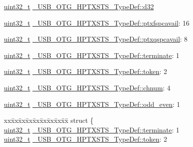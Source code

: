 \begin{DoxyCompactItemize}
\begin{tabbing}
\end{tabbing}\item 
\hyperlink{stdint_8h_a435d1572bf3f880d55459d9805097f62}{uint32\-\_\-t} \hyperlink{group___u_s_b___o_t_g___d_r_i_v_e_r_ga37309ecbbd147a4d89043f7e73582dc4}{\-\_\-\-U\-S\-B\-\_\-\-O\-T\-G\-\_\-\-H\-P\-T\-X\-S\-T\-S\-\_\-\-Type\-Def\-::d32}
\item 
\hyperlink{stdint_8h_a435d1572bf3f880d55459d9805097f62}{uint32\-\_\-t} \hyperlink{group___u_s_b___o_t_g___d_r_i_v_e_r_gac17dfee021a7eb4609cb89ca945f7c21}{\-\_\-\-U\-S\-B\-\_\-\-O\-T\-G\-\_\-\-H\-P\-T\-X\-S\-T\-S\-\_\-\-Type\-Def\-::ptxfspcavail}\-: 16
\item 
\hyperlink{stdint_8h_a435d1572bf3f880d55459d9805097f62}{uint32\-\_\-t} \hyperlink{group___u_s_b___o_t_g___d_r_i_v_e_r_ga59b1038925aee3e4714ff80a613b03d7}{\-\_\-\-U\-S\-B\-\_\-\-O\-T\-G\-\_\-\-H\-P\-T\-X\-S\-T\-S\-\_\-\-Type\-Def\-::ptxqspcavail}\-: 8
\item 
\hyperlink{stdint_8h_a435d1572bf3f880d55459d9805097f62}{uint32\-\_\-t} \hyperlink{group___u_s_b___o_t_g___d_r_i_v_e_r_ga881f78bc7a8ff5748d6de34919c171eb}{\-\_\-\-U\-S\-B\-\_\-\-O\-T\-G\-\_\-\-H\-P\-T\-X\-S\-T\-S\-\_\-\-Type\-Def\-::terminate}\-: 1
\item 
\hyperlink{stdint_8h_a435d1572bf3f880d55459d9805097f62}{uint32\-\_\-t} \hyperlink{group___u_s_b___o_t_g___d_r_i_v_e_r_gab78bb9c560c5ce625d76f00ff4b70791}{\-\_\-\-U\-S\-B\-\_\-\-O\-T\-G\-\_\-\-H\-P\-T\-X\-S\-T\-S\-\_\-\-Type\-Def\-::token}\-: 2
\item 
\hyperlink{stdint_8h_a435d1572bf3f880d55459d9805097f62}{uint32\-\_\-t} \hyperlink{group___u_s_b___o_t_g___d_r_i_v_e_r_ga90c08b176500a5c5a70082a3aae318b2}{\-\_\-\-U\-S\-B\-\_\-\-O\-T\-G\-\_\-\-H\-P\-T\-X\-S\-T\-S\-\_\-\-Type\-Def\-::chnum}\-: 4
\item 
\hyperlink{stdint_8h_a435d1572bf3f880d55459d9805097f62}{uint32\-\_\-t} \hyperlink{group___u_s_b___o_t_g___d_r_i_v_e_r_ga668937b5e6c1ce05ba41a2b1a71dcddd}{\-\_\-\-U\-S\-B\-\_\-\-O\-T\-G\-\_\-\-H\-P\-T\-X\-S\-T\-S\-\_\-\-Type\-Def\-::odd\-\_\-even}\-: 1
\item 
\begin{tabbing}
xx\=xx\=xx\=xx\=xx\=xx\=xx\=xx\=xx\=\kill
struct \{\\
\>\hyperlink{stdint_8h_a435d1572bf3f880d55459d9805097f62}{uint32\_t} \hyperlink{group___u_s_b___o_t_g___d_r_i_v_e_r_ga881f78bc7a8ff5748d6de34919c171eb}{\_USB\_OTG\_HPTXSTS\_TypeDef::terminate}: 1\\
\>\hyperlink{stdint_8h_a435d1572bf3f880d55459d9805097f62}{uint32\_t} \hyperlink{group___u_s_b___o_t_g___d_r_i_v_e_r_gab78bb9c560c5ce625d76f00ff4b70791}{\_USB\_OTG\_HPTXSTS\_TypeDef::token}: 2\\

\end{tabbing}
\end{DoxyCompactItemize}
